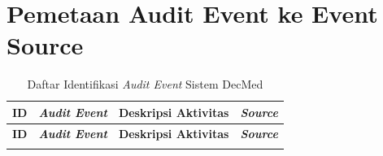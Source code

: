 \chapter{Pemetaan Audit Event ke Event Source}

\begin{xltabular}
    {\textwidth}
    {|>{\centering\arraybackslash}p{1.2cm}
     |>{\raggedright\arraybackslash}p{3.5cm}
     |X|
     |>{\raggedright\arraybackslash}p{2.8cm}|}

\caption{Daftar Identifikasi \textit{Audit Event} Sistem DecMed}
\label{tab:event-source-mapping}\\

\hline

\textbf{ID} &
\textbf{\textit{Audit Event}} &
\textbf{Deskripsi Aktivitas} &
\textbf{\textit{Source}} \\

\hline
\endfirsthead

\hline

\textbf{ID} &
\textbf{\textit{Audit Event}} &
\textbf{Deskripsi Aktivitas} &
\textbf{\textit{Source}} \\

\hline
\endhead

\hline
\endfoot

\hline
\endlastfoot


\end{xltabular}
